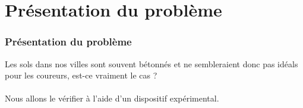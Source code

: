 \section{Présentation du problème}
\begin{frame}
\frametitle{Présentation du problème}
Les sols dans nos villes sont souvent bétonnés et ne sembleraient donc pas idéals pour les coureurs, est-ce vraiment le cas ?
\\
\\
Nous allons le vérifier à l'aide d'un dispositif expérimental.
\end{frame}
